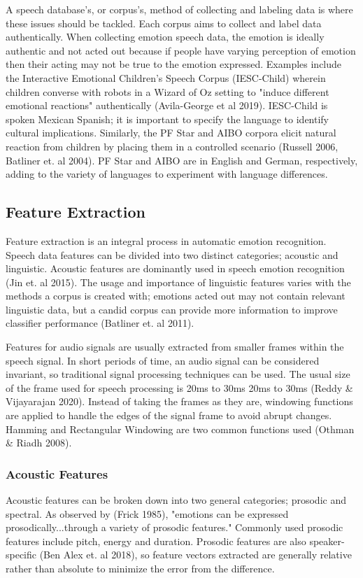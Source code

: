	A speech database's, or corpus's, method of collecting and labeling data is where these issues should be tackled. Each corpus aims to collect and label data authentically. When collecting emotion speech data, the emotion is ideally authentic and not acted out because if people have varying perception of emotion then their acting may not be true to the emotion expressed. Examples include the Interactive Emotional Children’s Speech Corpus (IESC-Child) wherein children converse with robots in a Wizard of Oz setting to "induce different emotional reactions" authentically (Avila-George et al 2019). IESC-Child is spoken Mexican Spanish; it is important to specify the language to identify cultural implications. Similarly, the PF Star and AIBO corpora elicit natural reaction from children by placing them in a controlled scenario (Russell 2006, Batliner et. al 2004). PF Star and AIBO are in English and German, respectively, adding to the variety of languages to experiment with language differences.

\subsection{Feature Extraction}
	Feature extraction is an integral process in automatic emotion recognition. Speech data features can be divided into two distinct categories; acoustic and linguistic. Acoustic features are dominantly used in speech emotion recognition (Jin et. al 2015). The usage and importance of linguistic features varies with the methods a corpus is created with; emotions acted out may not contain relevant linguistic data, but a candid corpus can provide more information to improve classifier performance (Batliner et. al 2011).
	
	Features for audio signals are usually extracted from smaller frames within the speech signal. In short periods of time, an audio signal can be considered invariant, so traditional signal processing techniques can be used. The usual size of the frame used for speech processing is 20ms to 30ms 20ms to 30ms  (Reddy \& Vijayarajan 2020). Instead of taking the frames as they are, windowing functions are applied to handle the edges of the signal frame to avoid abrupt changes. Hamming and Rectangular Windowing are two common functions used (Othman \& Riadh 2008).
\subsubsection{Acoustic Features}
	Acoustic features can be broken down into two general categories; prosodic and spectral. As observed by (Frick 1985), "emotions can be expressed prosodically...through a variety of prosodic features." Commonly used prosodic features include pitch, energy and duration. Prosodic features are also speaker-specific (Ben Alex et. al 2018), so feature vectors extracted are generally relative rather than absolute to minimize the error from the difference. 
	
